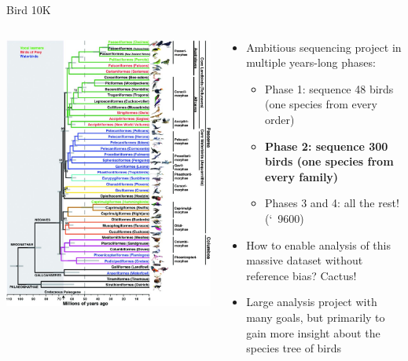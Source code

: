 \documentclass[10pt,
               hyperref={bookmarks=false,
                         bookmarksopen=false,
                         colorlinks=true,
                         linkcolor=blue,
                         urlcolor=blue},
               xcolor={svgnames,table}]{beamer}
\begin{document}
\begin{frame}{Bird 10K}
    \begin{columns}
        \begin{column}{0.5\textwidth}
            \includegraphics[width=\columnwidth]{images/B10K_tree.jpg}
        \end{column}
        \begin{column}{0.5\textwidth}
            \begin{itemize}
                \item Ambitious sequencing project in multiple years-long phases: \begin{itemize}
                    \item Phase 1: sequence 48 birds (one species from every order)
                    \item \textbf{Phase 2: sequence 300 birds (one species from every family)}
                    \item Phases 3 and 4: all the rest! (\char`~9600)
                \end{itemize}
                \item How to enable analysis of this massive dataset without reference bias? Cactus!
                \item Large analysis project with many goals, but primarily to gain more insight about the species tree of birds
            \end{itemize}
        \end{column}
    \end{columns}
\end{frame}
\end{document}
